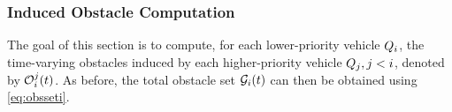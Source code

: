%

\subsubsection{Induced Obstacle Computation} \label{sec:intruder_iocomp}
The goal of this section is to compute, for each lower-priority vehicle $Q_i$, the time-varying obstacles induced by each higher-priority vehicle $Q_j, j < i$, denoted by $\mathcal{O}_i^j(t)$. As before, the total obstacle set $\mathcal{G}_i(t)$ can then be obtained using \eqref{eq:obsseti}. 


